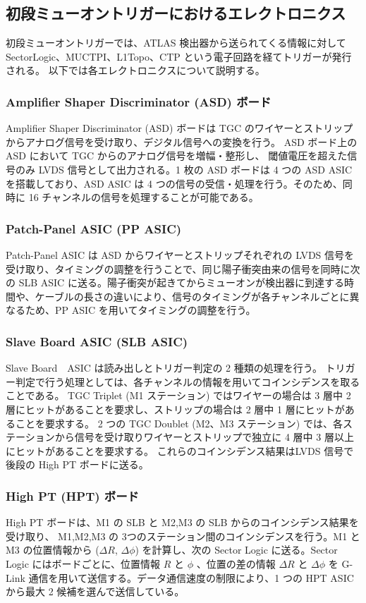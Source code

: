 \subsection{初段ミューオントリガーにおけるエレクトロニクス}
初段ミューオントリガーでは、ATLAS 検出器から送られてくる情報に対して SectorLogic、MUCTPI、L1Topo、CTP という電子回路を経てトリガーが発行される。
以下では各エレクトロニクスについて説明する。

\subsubsection{Amplifier Shaper Discriminator (ASD) ボード}
Amplifier Shaper Discriminator (ASD) ボードは TGC のワイヤーとストリップからアナログ信号を受け取り、デジタル信号への変換を行う。
ASD ボード上の ASD において TGC からのアナログ信号を増幅・整形し、 閾値電圧を超えた信号のみ LVDS 信号として出力される。1 枚の ASD ボードは 4 つの ASD ASIC を搭載しており、ASD ASIC は 4 つの信号の受信・処理を行う。そのため、同時に 16 チャンネルの信号を処理することが可能である。

\subsubsection{Patch-Panel ASIC (PP ASIC)}
Patch-Panel ASIC は ASD からワイヤーとストリップそれぞれの LVDS 信号を受け取り、タイミングの調整を行うことで、同じ陽子衝突由来の信号を同時に次の SLB ASIC に送る。陽子衝突が起きてからミューオンが検出器に到達する時間や、ケーブルの長さの違いにより、信号のタイミングが各チャンネルごとに異なるため、PP ASIC を用いてタイミングの調整を行う。

\subsubsection{Slave Board ASIC (SLB ASIC)}
Slave Board　ASIC は読み出しとトリガー判定の 2 種類の処理を行う。
トリガー判定で行う処理としては、各チャンネルの情報を用いてコインシデンスを取ることである。
TGC Triplet (M1 ステーション) ではワイヤーの場合は 3 層中 2 層にヒットがあることを要求し、ストリップの場合は 2 層中 1 層にヒットがあることを要求する。
2 つの TGC Doublet (M2、M3 ステーション) では、各ステーションから信号を受け取りワイヤーとストリップで独立に 4 層中 3 層以上にヒットがあることを要求する。 これらのコインシデンス結果はLVDS 信号で後段の High PT ボードに送る。

\subsubsection{High PT (HPT) ボード}
High PT ボードは、M1 の SLB と M2,M3 の SLB からのコインシデンス結果を受け取り、 M1,M2,M3 の 3つのステーション間のコインシデンスを行う。M1 と M3 の位置情報から ($\Delta R$, $\Delta \phi$) を計算し、次の Sector Logic に送る。Sector Logic にはボードごとに、位置情報 $R$ と $\phi$ 、位置の差の情報 $\Delta R$ と $\Delta \phi$ を G-Link 通信を用いて送信する。データ通信速度の制限により、1 つの HPT ASIC から最大 2 候補を選んで送信している。

